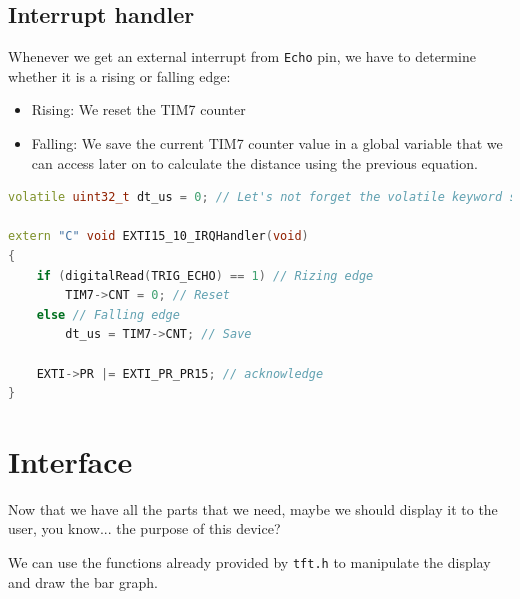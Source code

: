 \documentclass{article}
\begin{document}
\subsection{Interrupt handler}

Whenever we get an external interrupt from \verb|Echo| pin, we have to determine whether it is a rising or falling edge:
\begin{itemize}
    \item Rising: We reset the TIM7 counter
    \item Falling: We save the current TIM7 counter value in a global variable that we can access later on to calculate the distance using the previous equation.
\end{itemize}


\begin{lstlisting}[language=C++, caption={Echo interrupt handler}]
volatile uint32_t dt_us = 0; // Let's not forget the volatile keyword so that the compiler does not do anything funny

extern "C" void EXTI15_10_IRQHandler(void)
{
    if (digitalRead(TRIG_ECHO) == 1) // Rizing edge
        TIM7->CNT = 0; // Reset
    else // Falling edge
        dt_us = TIM7->CNT; // Save

    EXTI->PR |= EXTI_PR_PR15; // acknowledge
}
\end{lstlisting}

\section{Interface}

Now that we have all the parts that we need, maybe we should display it to the user, you know... the purpose of this device?

We can use the functions already provided by \verb|tft.h| to manipulate the display and draw the bar graph.
\end{document}
